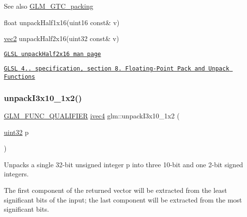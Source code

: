 \begin{DoxySeeAlso}{See also}
\hyperlink{group__gtc__packing}{G\+L\+M\+\_\+\+G\+T\+C\+\_\+packing} 

float unpack\+Half1x16(uint16 const\& v) 

\hyperlink{group__core__types_gaa1618f51db67eaa145db101d8c8431d8}{vec2} unpack\+Half2x16(uint32 const\& v) 

\href{http://www.opengl.org/sdk/docs/manglsl/xhtml/unpackHalf2x16.xml}{\tt G\+L\+SL unpack\+Half2x16 man page} 

\href{http://www.opengl.org/registry/doc/GLSLangSpec.4.20.8.pdf}{\tt G\+L\+SL 4.. specification, section 8. Floating-\/\+Point Pack and Unpack Functions} 
\end{DoxySeeAlso}
\mbox{\label{group__gtc__packing_ga08bcd34cf9c34701d658dd861ee6e300}} 
\subsubsection{\texorpdfstring{unpack\+I3x10\+\_\+1x2()}{unpackI3x10\_1x2()}}
{\footnotesize\ttfamily \hyperlink{setup_8hpp_a33fdea6f91c5f834105f7415e2a64407}{G\+L\+M\+\_\+\+F\+U\+N\+C\+\_\+\+Q\+U\+A\+L\+I\+F\+I\+ER} \hyperlink{group__core__types_gaa4560ddc50320ea8f8a70d5c9c249fea}{ivec4} glm\+::unpack\+I3x10\+\_\+1x2 (\begin{DoxyParamCaption}\item[{\hyperlink{group__gtc__type__precision_ga202b6a53c105fcb7e531f9b443518451}{uint32}}]{p }\end{DoxyParamCaption})}

Unpacks a single 32-\/bit unsigned integer p into three 10-\/bit and one 2-\/bit signed integers.

The first component of the returned vector will be extracted from the least significant bits of the input; the last component will be extracted from the most significant bits.

